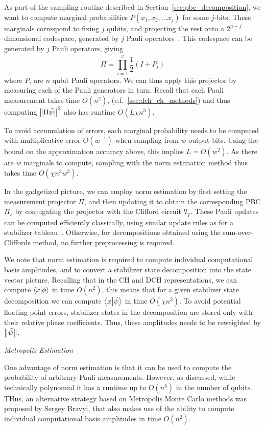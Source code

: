 As part of the sampling routine described in Section~\ref{sec:pbc_decomposition}, we want to compute marginal probabilities $P\left(x_{1},x_{2},\dots x_{j}\right)$ for some $j$-bits. These marginals correspond to fixing $j$ qubits, and projecting the rest onto a $2^{n-j}$ dimensional codespace, generated by $j$ Pauli operators~\cite{Bravyi2016}. This codespace can be generated by $j$ Pauli operators, giving
\[\Pi = \prod_{i=1}^{j}\frac{1}{2}\left(I+P_{i}\right)\]
where $P_{i}$ are $n$ qubit Pauli operators. We can thus apply this projector by measuring each of the Pauli generators in turn. Recall that each Pauli measurement takes time $O(n^{2})$, (c.f.~\ref{sec:dch_ch_methods}) and thus computing $\norm{\Pi\tilde{\psi}}^{2}$ also has runtime $O\left(L\chi n^{3}\right)$.\par
To avoid accumulation of errors, each marginal probability needs to be computed with multiplicative error $O(w^{-1})$ when sampling from $w$ output bits. Using the bound on the approximation accuracy above, this implies $L=O(w^{2})$. As there are $w$ marginals to compute, sampling with the norm estimation method thus takes time $O(\chi n^{3}w^{3})$.\par
In the gadgetized picture, we can employ norm estimation by first setting the measurement projector $\Pi$, and then updating it to obtain the corresponding PBC $\Pi_{s}$ by conjugating the projector with the Clifford circuit $\mathtt{V_{y}}$. These Pauli updates can be computed efficiently classically, using similar update rules as for a stabilizer tableau~\cite{Aaronson2004}. Otherwise, for decompositions obtained using the sum-over-Cliffords method, no further preprocessing is required.\par
We note that norm estimation is required to compute individual computational basis amplitudes, and to convert a stabilizer state decomposition into the state vector picture. Recalling that in the CH and DCH representations, we can compute $\braket{x}{\phi}$ in time $O(n^{2})$, this means that for a given stabilizer state decomposition we can compute $\braket{x}{\tilde{\psi}}$ in time $O(\chi n^{2})$. To avoid potential floating point errors, stabilizer states in the decomposition are stored only with their relative phase coefficients. Thus, these amplitudes needs to be reweighted by $\norm{\tilde{\psi}}$.\par
\large{\itshape{Metropolis Estimation}}\par
One advantage of norm estimation is that it can be used to compute the probability of arbitrary Pauli measurements. However, as discussed, while technically polynomial it has a runtime up to $O(n^{6})$ in the number of qubits. THus, an alternative strategy based on Metropolis Monte Carlo methods was proposed by Sergey Bravyi, that also makes use of the ability to compute individual computational basis amplitudes in time $O(n^{2})$.\par
